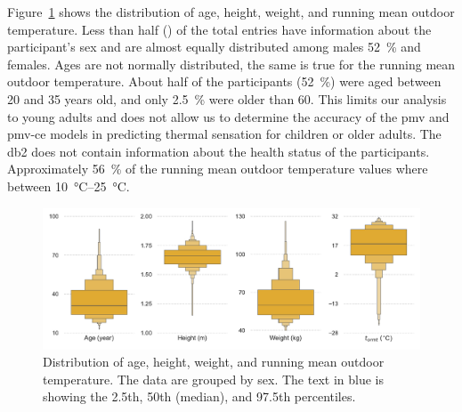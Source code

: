 Figure~\ref{fig:dist_other_data} shows the distribution of age, height, weight, and running mean outdoor temperature.
Less than half () of the total entries have information about the participant's sex and are almost equally distributed among males \qty{52}{\percent} and females.
Ages are not normally distributed, the same is true for the running mean outdoor temperature.
About half of the participants (\qty{52}{\percent}) were aged between \num{20} and \num{35} years old, and only \qty{2.5}{\percent} were older than 60.
This limits our analysis to young adults and does not allow us to determine the accuracy of the \ac{pmv} and \ac{pmv-ce} models in predicting thermal sensation for children or older adults.
The \ac{db2} does not contain information about the health status of the participants.
Approximately \qty{56}{\percent} of the running mean outdoor temperature values where between \qtyrange{10}{25}{\celsius}.
\begin{figure}[htb!]
    \centering
    \includegraphics[width=\textwidth]{figures/dist_other_data}
    \caption{Distribution of age, height, weight, and running mean outdoor temperature.
    The data are grouped by sex.
    The text in blue is showing the 2.5th, 50th (median), and 97.5th percentiles.}
    \label{fig:dist_other_data}
\end{figure}

